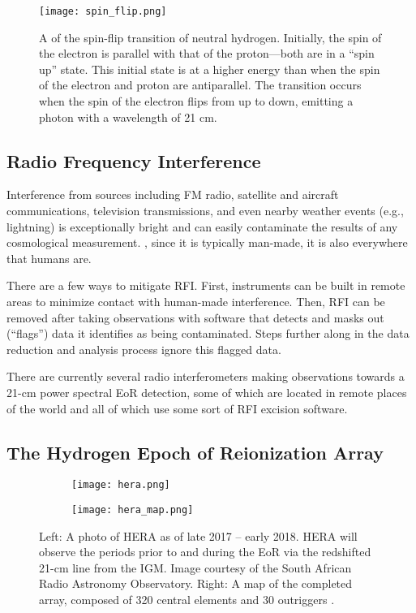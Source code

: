 \documentclass[12pt]{article}
\begin{document}
\begin{figure}[t]
	\centering
	\texttt{[image: spin\_flip.png]}
	\caption[The spin-flip transition of neutral hydrogen]{A  of the spin-flip transition of neutral hydrogen. Initially, the spin of the electron is parallel with that of the proton---both are in a ``spin up'' state. This initial state is at a higher energy than when the spin of the electron and proton are antiparallel. The transition occurs when the spin of the electron flips from up to down, emitting a photon with a wavelength of 21 cm.}
	\label{fig:spin_flip}
\end{figure}

\subsection{Radio Frequency Interference} \label{subsec:rfi}

Interference from sources including FM radio, satellite and aircraft communications, television transmissions, and even nearby weather events (e.g., lightning) is exceptionally bright and can easily contaminate the results of any cosmological measurement. , since it is typically man-made, it is also everywhere that humans are.

There are a few ways to mitigate RFI. First, instruments can be built in remote areas to minimize contact with human-made interference. Then, RFI can be removed after taking observations with software that detects and masks out (``flags'') data it identifies as being contaminated. Steps further along in the data reduction and analysis process ignore this flagged data.

There are currently several radio interferometers making observations towards a 21-cm power spectral EoR detection, some of which are located in remote places of the world and all  of which use some sort of RFI excision software. 

\subsection{The Hydrogen Epoch of Reionization Array} \label{subsec:hera}

\begin{figure}[tb]
	\centering
	\begin{subfigure}{0.48\textwidth}
		\centering
		{\texttt{[image: hera.png]}}
	\end{subfigure} \hfill
	\begin{subfigure}{0.48\textwidth}
		\centering
		{\texttt{[image: hera\_map.png]}}
	\end{subfigure}
	\caption[The Hydrogen Epoch of Reionization Array]{Left: A photo of HERA as of late 2017 -- early 2018. HERA will observe the periods prior to and during the EoR via the redshifted 21-cm line from the IGM. Image courtesy of the South African Radio Astronomy Observatory. Right: A map of the completed array, composed of 320 central elements and 30 outriggers \citep{deboer2017}.}
	\label{fig:hera}
\end{figure}
\end{document}
